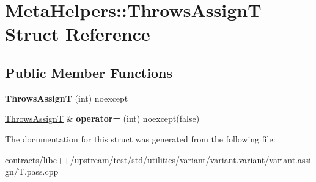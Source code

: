 \hypertarget{struct_meta_helpers_1_1_throws_assign_t}{}\section{Meta\+Helpers\+:\+:Throws\+AssignT Struct Reference}
\label{struct_meta_helpers_1_1_throws_assign_t}
\subsection*{Public Member Functions}
\begin{DoxyCompactItemize}
\item 
\mbox{\label{struct_meta_helpers_1_1_throws_assign_t_a2d3fd2629c3f544cd63899164ac46b42}} 
{\bfseries Throws\+AssignT} (int) noexcept
\item 
\mbox{\label{struct_meta_helpers_1_1_throws_assign_t_a36f0e5b4f8a9c85d411f3ba06fabee55}} 
\mbox{\hyperlink{struct_meta_helpers_1_1_throws_assign_t}{Throws\+AssignT}} \& {\bfseries operator=} (int) noexcept(false)
\end{DoxyCompactItemize}


The documentation for this struct was generated from the following file\+:\begin{DoxyCompactItemize}
\item 
contracts/libc++/upstream/test/std/utilities/variant/variant.\+variant/variant.\+assign/T.\+pass.\+cpp\end{DoxyCompactItemize}
